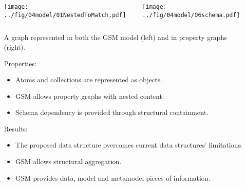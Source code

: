 \begin{multilucido}
	\begin{sottolucido}
		\begin{columns}[onlytextwidth]
			\begin{column}{.45\textwidth}
				\texttt{[image: ../fig/04model/01NestedToMatch.pdf]}
			\end{column}
			\hfill
			\begin{column}{.45\textwidth}
				\texttt{[image: ../fig/04model/06schema.pdf]}
			\end{column}
		\end{columns}
		A graph represented in both the GSM model (left) and in property graphs (right).
	\end{sottolucido}

	\begin{sottolucido}
		Properties:
		\begin{itemize}
			\item Atoms and collections are represented as objects.
			\item GSM allows property graphs with nested content.
			\item Schema dependency is provided through structural containment.
		\end{itemize}
		Results:
		\begin{itemize}
			\item The proposed data structure overcomes current data structures’ limitations.
			\item GSM allows structural aggregation.
			\item  GSM provides data, model and metamodel pieces of information.
			
		\end{itemize}
	\end{sottolucido}
\end{multilucido}